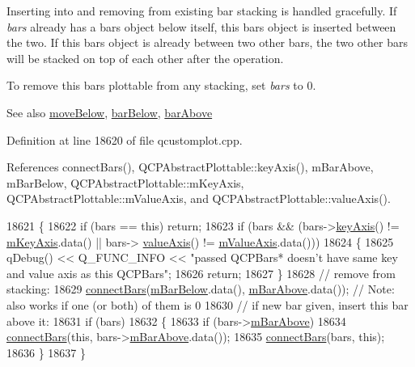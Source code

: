 Inserting into and removing from existing bar stacking is handled gracefully. If {\itshape bars} already has a bars object below itself, this bars object is inserted between the two. If this bars object is already between two other bars, the two other bars will be stacked on top of each other after the operation.

To remove this bars plottable from any stacking, set {\itshape bars} to 0.

\begin{DoxySeeAlso}{See also}
\hyperlink{class_q_c_p_bars_a69fc371346980f19177c3d1ecdad78ee}{move\+Below}, \hyperlink{class_q_c_p_bars_a2c46a686cbad95f180ca3c2e88263961}{bar\+Below}, \hyperlink{class_q_c_p_bars_a9ca48a6577586825d85bdc1fbf410803}{bar\+Above} 
\end{DoxySeeAlso}


Definition at line 18620 of file qcustomplot.\+cpp.



References connect\+Bars(), Q\+C\+P\+Abstract\+Plottable\+::key\+Axis(), m\+Bar\+Above, m\+Bar\+Below, Q\+C\+P\+Abstract\+Plottable\+::m\+Key\+Axis, Q\+C\+P\+Abstract\+Plottable\+::m\+Value\+Axis, and Q\+C\+P\+Abstract\+Plottable\+::value\+Axis().


\begin{DoxyCode}
18621 \{
18622   \textcolor{keywordflow}{if} (bars == \textcolor{keyword}{this}) \textcolor{keywordflow}{return};
18623   \textcolor{keywordflow}{if} (bars && (bars->\hyperlink{class_q_c_p_abstract_plottable_a72c7a09c22963f2c943f07112b311103}{keyAxis}() != \hyperlink{class_q_c_p_abstract_plottable_a426f42e254d0f8ce5436a868c61a6827}{mKeyAxis}.data() || bars->
      \hyperlink{class_q_c_p_abstract_plottable_a3106f9d34d330a6097a8ec5905e5b519}{valueAxis}() != \hyperlink{class_q_c_p_abstract_plottable_a2901452ca4aea911a1827717934a4bda}{mValueAxis}.data()))
18624   \{
18625     qDebug() << Q\_FUNC\_INFO << \textcolor{stringliteral}{"passed QCPBars* doesn't have same key and value axis as this QCPBars"};
18626     \textcolor{keywordflow}{return};
18627   \}
18628   \textcolor{comment}{// remove from stacking:}
18629   \hyperlink{class_q_c_p_bars_a6ea37802cd22f97235cab614b14b9f19}{connectBars}(\hyperlink{class_q_c_p_bars_ad51db970eed7e286f2753b0216fc56de}{mBarBelow}.data(), \hyperlink{class_q_c_p_bars_a0c1c46076c41a478dbb373cfd35929aa}{mBarAbove}.data()); \textcolor{comment}{// Note: also works if one
       (or both) of them is 0}
18630   \textcolor{comment}{// if new bar given, insert this bar above it:}
18631   \textcolor{keywordflow}{if} (bars)
18632   \{
18633     \textcolor{keywordflow}{if} (bars->\hyperlink{class_q_c_p_bars_a0c1c46076c41a478dbb373cfd35929aa}{mBarAbove})
18634       \hyperlink{class_q_c_p_bars_a6ea37802cd22f97235cab614b14b9f19}{connectBars}(\textcolor{keyword}{this}, bars->\hyperlink{class_q_c_p_bars_a0c1c46076c41a478dbb373cfd35929aa}{mBarAbove}.data());
18635     \hyperlink{class_q_c_p_bars_a6ea37802cd22f97235cab614b14b9f19}{connectBars}(bars, \textcolor{keyword}{this});
18636   \}
18637 \}
\end{DoxyCode}


